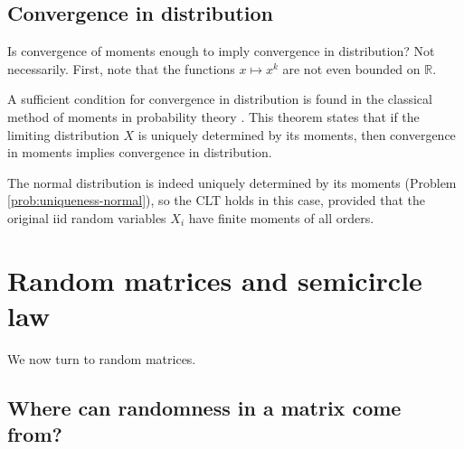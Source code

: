 \documentclass[letterpaper,11pt,oneside,reqno]{article}
\numberwithin{equation}{section}
\theoremstyle{definition}
\begin{document}
\subsection{Convergence in distribution}

Is convergence of moments enough to imply convergence in
distribution? Not necessarily. First, note that the functions
$x\mapsto x^k$ are not even bounded on $\mathbb{R}$.

A sufficient condition for convergence in distribution is
found in the
classical method of moments in
probability theory \cite[Theorem~30.2]{billingsley1995probability}.
This theorem
states that
if the limiting distribution $X$ is uniquely determined by its moments,
then convergence in moments implies convergence in distribution.

The normal distribution is indeed uniquely determined by its
moments (Problem \ref{prob:uniqueness-normal}),
so the CLT holds in this case, provided that the
original iid random variables $X_i$ have finite moments of
all orders.

\section{Random matrices and semicircle law}

We now turn to random matrices.

\subsection{Where can randomness in a matrix come from?}
\end{document}
